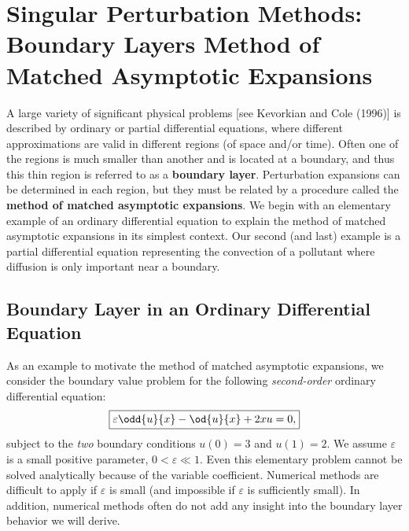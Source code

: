 
\section{Singular Perturbation Methods: Boundary Layers Method of Matched Asymptotic Expansions}
\label{sec:14.10}

A large variety of significant physical problems [see Kevorkian and Cole (1996)] is described by ordinary or partial differential equations, where different approximations are valid in different regions (of space and/or time). Often one of the regions is much smaller than another and is located at a boundary, and thus this thin region is referred to as a \textbf{boundary layer}. Perturbation expansions can be determined in each region, but they must be related by a procedure called the \textbf{method of matched asymptotic expansions}. We begin with an elementary example of an ordinary differential equation to explain the method of matched asymptotic expansions in its simplest context. Our second (and last) example is a partial differential equation representing the convection of a pollutant where diffusion is only important near a boundary.

\subsection{Boundary Layer in an Ordinary Differential Equation}
\label{subsec:14.10.1}

As an example to motivate the method of matched asymptotic expansions, we consider the boundary value problem for the following \emph{second-order} ordinary differential equation:
\begin{equation}
\boxed{\varepsilon\odd{u}{x} - \od{u}{x} + 2xu = 0,}
\label{eq:14.10.1}
\end{equation}
subject to the \emph{two} boundary conditions $u(0) = 3$ and $u(1) = 2$. We assume $\varepsilon$ is a small positive parameter, $0 < \varepsilon \ll 1$. Even this elementary problem cannot be solved analytically because of the variable coefficient. Numerical methods are difficult to apply if $\varepsilon$ is small (and impossible if $\varepsilon$ is sufficiently small). In addition, numerical methods often do not add any insight into the boundary layer behavior we will derive.

